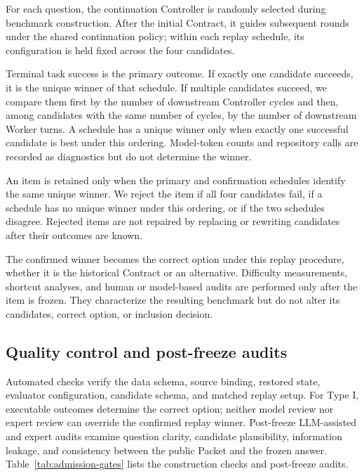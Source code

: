 For each question, the continuation Controller is randomly selected during benchmark construction. After the initial Contract, it guides subsequent rounds under the shared continuation policy; within each replay schedule, its configuration is held fixed across the four candidates.

Terminal task success is the primary outcome. If exactly one candidate succeeds, it is the unique winner of that schedule. If multiple candidates succeed, we compare them first by the number of downstream Controller cycles and then, among candidates with the same number of cycles, by the number of downstream Worker turns. A schedule has a unique winner only when exactly one successful candidate is best under this ordering. Model-token counts and repository calls are recorded as diagnostics but do not determine the winner.

An item is retained only when the primary and confirmation schedules identify the same unique winner. We reject the item if all four candidates fail, if a schedule has no unique winner under this ordering, or if the two schedules disagree. Rejected items are not repaired by replacing or rewriting candidates after their outcomes are known.

The confirmed winner becomes the correct option under this replay procedure, whether it is the historical Contract or an alternative. Difficulty measurements, shortcut analyses, and human or model-based audits are performed only after the item is frozen. They characterize the resulting benchmark but do not alter its candidates, correct option, or inclusion decision.

\subsection{Quality control and post-freeze audits}
\label{app:admission}

Automated checks verify the data schema, source binding, restored state, evaluator configuration, candidate schema, and matched replay setup. For Type I, executable outcomes determine the correct option; neither model review nor expert review can override the confirmed replay winner. Post-freeze LLM-assisted and expert audits examine question clarity, candidate plausibility, information leakage, and consistency between the public Packet and the frozen answer. Table~\ref{tab:admission-gates} lists the construction checks and post-freeze audits.

